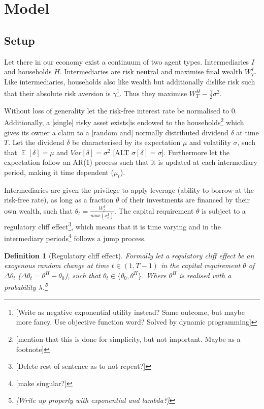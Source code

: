 \documentclass[11pt]{article}
\DeclareMathOperator{\E}{\mathbb{E}} %
\newtheorem{definition}{Definition}%
\begin{document}

\section{Model}

\subsection*{Setup}

Let there in our economy exist a continuum of two agent types. Intermediaries $I$ and households $H$. Intermediaries are risk neutral and maximise final wealth $W^I_T$. Like intermediaries, households also like wealth but additionally dislike risk such that their absolute risk aversion is $\gamma$\footnote{[Write as negative exponential utility instead? Same outcome, but maybe more fancy. Use objective function word? Solved by dynamic programming]}. Thus they maximise $W^H_T - \frac{\gamma}{2}\sigma^2$.

Without loss of generality let the risk-free interest rate be normalised to 0. Additionally, a [single] risky asset exists[is endowed to the households\footnote{[mention that this is done for simplicity, but not important. Maybe as a footnote]} which gives its owner a claim to a [random and] normally distributed dividend $\delta$ at time $T$. Let the dividend $\delta$ be characterised by its expectation $\mu$ and volatility $\sigma$, such that $\E[\delta] = \mu$ and $Var[\delta] = \sigma^2$ [ALT $\sigma[\delta] = \sigma$]. Furthermore let the expectation follow an AR(1) process such that it is updated at each intermediary period, making it time dependent ($\mu_t$).

Intermediaries are given the privilege to apply leverage (ability to borrow at the risk-free rate), as long as a fraction $\theta$ of their investments are financed by their own wealth, such that $\theta_t = \frac{W^I_t}{max(x^{I}_t)}$. The capital requirement $\theta$ is subject to a regulatory cliff effect\footnote{[Delete rest of sentence as to not repeat?]}, which means that it is time varying and in the intermediary periods\footnote{[make singular?]} follows a jump process. 

\begin{definition}[Regulatory cliff effect] Formally let a regulatory cliff effect be an exogenous random change at time $t \in (1,T-1)$ in the capital requirement $\theta$ of $\Delta \theta_t$ ($\Delta \theta_t =  \theta^H-\theta_0$), such that $\theta_t \in \{\theta_0,\theta^H\}$. Where $\theta^H$ is realised with a probability $\lambda$.\footnote{[Write up properly with exponential and lambda?]}
\end{definition}
\end{document}
